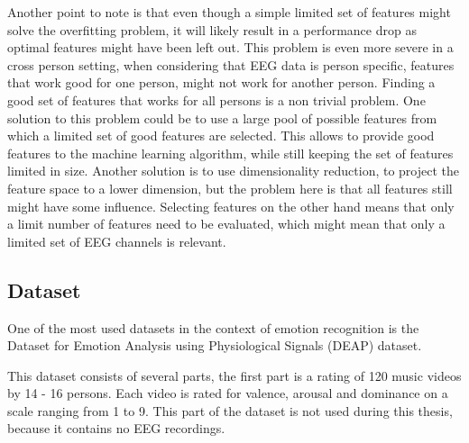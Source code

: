 \npar

Another point to note is that even though a simple limited set of features might solve the overfitting problem, it will likely result in a performance drop as optimal features might have been left out. This problem is even more severe in a cross person setting, when considering that EEG data is person specific\citep{DEAP}, features that work good for one person, might not work for another person. Finding a good set of features that works for all persons is a non trivial problem. One solution to this problem could be to use a large pool of possible features from which a limited set of good features are selected. This allows to provide good features to the machine learning algorithm, while still keeping the set of features limited in size. Another solution is to use dimensionality reduction, to project the feature space to a lower dimension, but the problem here is that all features still might have some influence. Selecting features on the other hand means that only a limit number of features need to be evaluated, which might mean that only a limited set of EEG channels is relevant.

\subsection{Dataset}
One of the most used datasets in the context of emotion recognition is the Dataset for Emotion Analysis using Physiological Signals (DEAP) dataset\cite{DEAP}.

\npar

This dataset consists of several parts, the first part is a rating of 120 music videos by 14 - 16 persons. Each video is rated for valence, arousal and dominance on a scale ranging from 1 to 9. This part of the dataset is not used during this thesis, because it contains no EEG recordings.

\npar

